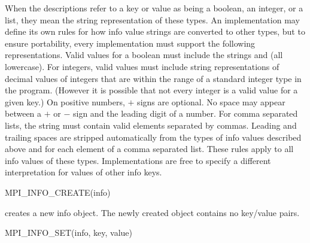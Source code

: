 When the descriptions refer to a key or value as being a boolean, an
integer, or a list, they mean the string representation of these
types.  An implementation may define its own rules for how info value
strings are converted to other types, but to ensure portability, every
implementation must support the following representations.  Valid
values for a boolean must include the strings  and 
(all lowercase).  For integers, valid values must include string
representations of decimal values of integers that are within the
range of a standard integer type in the program.  (However it is
possible that not every integer is a valid value for a given
key.)  On positive numbers, $+$ signs are optional.  No space may
appear between a $+$ or $-$ sign and the leading digit of a number.  For
comma separated lists, the string must contain valid elements
separated by commas.  Leading and trailing spaces are stripped
automatically from the types of info values described above and for
each element of a comma separated list.  These rules apply to all info
values of these types.  Implementations are free to specify a
different interpretation for values of other info keys.

%
\begin{funcdef}{MPI\_INFO\_CREATE}{(\mbox{info})}
\end{funcdef}

 creates a new info object. The newly created object contains
no key/value pairs. 

%
\begin{funcdef}{MPI\_INFO\_SET}{(\mbox{info}, \mbox{key}, \mbox{value})}
\end{funcdef}

